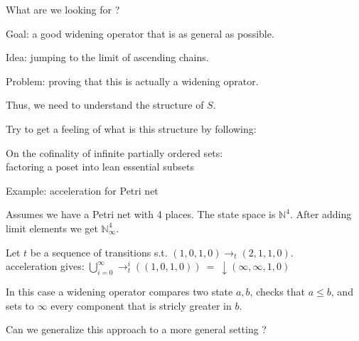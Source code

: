 \documentclass{beamer}
\begin{document}
\begin{frame}{What are we looking for ?}

Goal: a good widening operator that is as general as possible.

\vspace{10pt}

Idea: jumping to the limit of ascending chains.

\vspace{10pt}

Problem: proving that this is actually a widening oprator.

\vspace{10pt}

Thus, we need to understand the \alert{structure} of $S$.

\vspace{10pt}

Try to get a feeling of what is this structure by following:
\begin{block}{\cite{DiestelPikhurko03FactoringPoset}}
\centering
On the cofinality of infinite partially ordered sets:\\
factoring a poset into lean essential subsets
\end{block}

\end{frame}

\begin{frame}{Example: acceleration for Petri net}

Assumes we have a Petri net with 4 places.
The state space is $\mathbb{N}^4$.
After adding limit elements we get $\mathbb{N}^4_\infty$.

\vspace{10pt}

Let $t$ be a sequence of transitions s.t. $(1,0,1,0) \rightarrow_t (2,1,1,0)$.\\
acceleration gives: $\bigcup_{i=0}^\infty \rightarrow_t^i((1,0,1,0)) ~ = ~ \downarrow (\infty, \infty, 1, 0)$

\vspace{10pt}

In this case a widening operator compares two state $a,b$, checks that $a \leq b$, and sets to $\infty$ every component that is stricly greater in $b$.

\vspace{10pt}

Can we generalize this approach to a more general setting ?

\end{frame}
\end{document}
